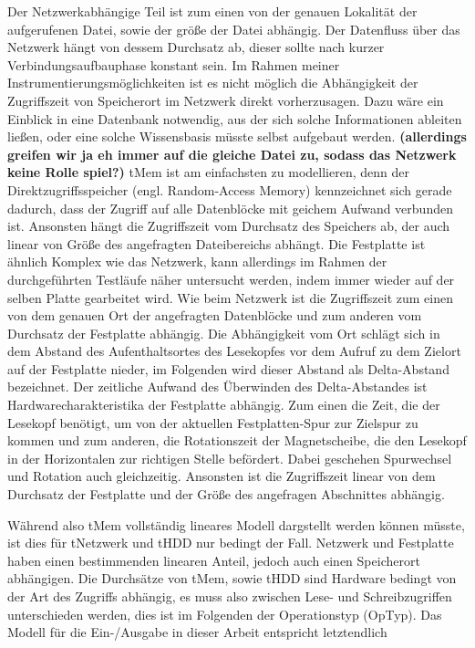 \documentclass[
	12pt,
	a4paper,
	BCOR10mm,
	DIV14,
	listof=totoc,
	bibliography=totoc,
	headsepline
]{scrreprt}
\begin{document}
Der Netzwerkabhängige Teil ist zum einen von der genauen Lokalität der aufgerufenen Datei, sowie der größe der Datei abhängig. Der Datenfluss über das Netzwerk hängt von dessem Durchsatz ab, dieser sollte nach kurzer Verbindungsaufbauphase konstant sein. Im Rahmen meiner Instrumentierungsmöglichkeiten ist es nicht möglich die Abhängigkeit der Zugriffszeit von Speicherort im Netzwerk direkt vorherzusagen. Dazu wäre ein Einblick in eine Datenbank notwendig, aus der sich solche Informationen ableiten ließen, oder eine solche Wissensbasis müsste selbst aufgebaut werden. \textbf{(allerdings greifen wir ja eh immer auf die gleiche Datei zu, sodass das Netzwerk keine Rolle spiel?)}
tMem ist am einfachsten zu modellieren, denn der Direktzugriffsspeicher (engl. Random-Access Memory) kennzeichnet sich gerade dadurch, dass der Zugriff auf alle Datenblöcke mit geichem Aufwand verbunden ist. Ansonsten hängt die Zugriffszeit vom Durchsatz des Speichers ab, der auch linear von Größe des angefragten Dateibereichs abhängt.
Die Festplatte ist ähnlich Komplex wie das Netzwerk, kann allerdings im Rahmen der durchgeführten Testläufe näher untersucht werden, indem immer wieder auf der selben Platte gearbeitet wird. Wie beim Netzwerk ist die Zugriffszeit zum einen von dem genauen Ort der angefragten Datenblöcke und zum anderen vom Durchsatz der Festplatte abhängig. Die Abhängigkeit vom Ort schlägt sich in dem Abstand des Aufenthaltsortes des Lesekopfes vor dem Aufruf zu dem Zielort auf der Festplatte nieder, im Folgenden wird dieser Abstand als Delta-Abstand bezeichnet. Der zeitliche Aufwand des Überwinden des Delta-Abstandes ist Hardwarecharakteristika der Festplatte abhängig. Zum einen die Zeit, die der Lesekopf benötigt, um von der aktuellen Festplatten-Spur zur Zielspur zu kommen und zum anderen, die Rotationszeit der Magnetscheibe, die den Lesekopf in der Horizontalen zur richtigen Stelle befördert. Dabei geschehen Spurwechsel und Rotation auch gleichzeitig. Ansonsten ist die Zugriffszeit linear von dem Durchsatz der Festplatte und der Größe des angefragen Abschnittes abhängig.

Während also tMem vollständig lineares Modell dargstellt werden können müsste, ist dies für tNetzwerk und tHDD nur bedingt der Fall. Netzwerk und Festplatte haben einen bestimmenden linearen Anteil, jedoch auch einen Speicherort abhängigen.
Die Durchsätze von tMem, sowie tHDD sind Hardware bedingt von der Art des Zugriffs abhängig, es muss also zwischen Lese- und Schreibzugriffen unterschieden werden, dies ist im Folgenden der Operationstyp (OpTyp).
Das Modell für die Ein-/Ausgabe in dieser Arbeit entspricht letztendlich
\end{document}
